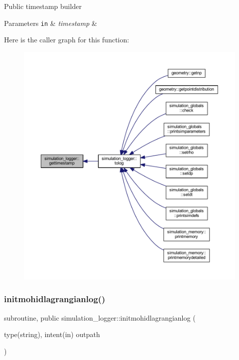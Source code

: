 Public timestamp builder 
\begin{DoxyParams}[1]{Parameters}
\mbox{\tt in}  & {\em timestamp} & \\
\hline
\end{DoxyParams}
Here is the caller graph for this function\+:
\nopagebreak
\begin{figure}[H]
\begin{center}
\leavevmode
\includegraphics[width=350pt]{namespacesimulation__logger_a13446c36aac51547a72b39003f735257_icgraph}
\end{center}
\end{figure}
\mbox{\label{namespacesimulation__logger_a9c7922c1d3cd57c8322f047799fc6053}} 
\subsubsection{\texorpdfstring{initmohidlagrangianlog()}{initmohidlagrangianlog()}}
{\footnotesize\ttfamily subroutine, public simulation\+\_\+logger\+::initmohidlagrangianlog (\begin{DoxyParamCaption}\item[{type(string), intent(in)}]{outpath }\end{DoxyParamCaption})}



